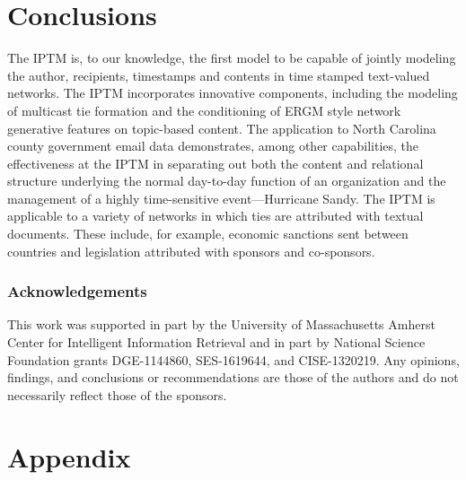 \documentclass[twoside]{article}
\begin{document}
\section{Conclusions}\label{sec:Conclusions}
The IPTM is, to our knowledge, the first model to be capable of jointly modeling the author, recipients, timestamps and contents in time stamped text-valued networks. The IPTM incorporates innovative components, including the modeling of multicast tie formation and the conditioning of ERGM style network generative features on topic-based content. The application to North Carolina county government email data demonstrates, among other capabilities, the effectiveness at the IPTM in separating out both the content and relational structure underlying the normal day-to-day function of an organization and the management of a highly time-sensitive event---Hurricane Sandy. The IPTM is applicable to a variety of networks in which ties are attributed with textual documents. These include, for example, economic sanctions sent between countries and legislation attributed with sponsors and co-sponsors. 
\subsubsection*{Acknowledgements}
This work was supported in part by the University of Massachusetts Amherst Center for Intelligent Information Retrieval and in part by National Science Foundation grants DGE-1144860, SES-1619644, and CISE-1320219. Any opinions, findings, and conclusions or recommendations are those of the authors and do not necessarily reflect those of the sponsors.


\newpage
\appendix
\section*{Appendix}
\renewcommand{\thesubsection}{\Alph{subsection}}
\end{document}
